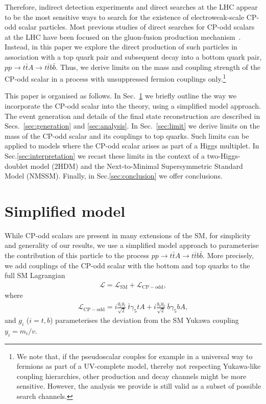 \documentclass[preprintnumbers,superscriptaddress,nofootinbib,aps,prd,floatfix]{revtex4}
\begin{document}
Therefore, indirect detection experiments and direct searches at the LHC appear to be the most sensitive ways to search for the existence of electroweak-scale CP-odd scalar particles. Most previous studies of direct searches for CP-odd scalars at the LHC have been focused on the gluon-fusion production mechanism~\cite{Klamke:2007cu,Dolan:2014upa}. Instead, in this paper we explore the direct production of such particles in association with a top quark pair and subsequent decay into a bottom quark pair, $p p \to t \bar{t} A \to t \bar{t} b \bar{b}$. Thus, we derive limits on the mass and coupling strength of the CP-odd scalar in a process with unsuppressed fermion couplings only.\footnote{We note that, if the pseudoscalar couples for example in a universal way to fermions as part of a UV-complete model, thereby not respecting Yukawa-like coupling hierarchies, other production and decay channels might be more sensitive. However, the analysis we provide is still valid as a subset of possible search channels.}

This paper is organised as follows. In Sec.~\ref{sec:model} we briefly outline the way we incorporate the CP-odd scalar into the theory, using a simplified model approach. The event generation and details of the final state reconstruction are described in Secs.~\ref{sec:generation} and \ref{sec:analysis}. In Sec.~\ref{sec:limit} we derive limits on the mass of the CP-odd scalar and its couplings to top quarks. Such limits can be applied to models where the CP-odd scalar arises as part of a Higgs multiplet. In Sec.\ref{sec:interpretation} we recast these limits in the context of a two-Higgs-doublet model (2HDM) and the 
Next-to-Minimal Supersymmetric Standard Model (NMSSM). Finally, in Sec.\ref{sec:conclusion} we offer conclusions.

\section{Simplified model}
\label{sec:model}
While CP-odd scalars are present in many extensions of the SM, for simplicity and generality of our results, we use a simplified model approach \cite{Alves:2011wf} to parameterise the contribution of this particle to the process $p p \to t \bar{t} A \to t \bar{t} b \bar{b}$. More precisely, we add couplings of the CP-odd scalar with the bottom and top quarks to the full SM Lagrangian 
\begin{eqnarray}
\mathcal{L} = \mathcal{L}_{\mathrm{SM}} + \mathcal{L}_{\mathrm{CP-odd}},
\label{eq:lagrangian}
\end{eqnarray}
where 
\begin{eqnarray}
\mathcal{L}_{\mathrm{CP-odd}} = i \frac{g_{t} y_t}{\sqrt{2}}~\bar{t} \gamma_5 t A + i \frac{g_{b} y_b}{\sqrt{2}}~\bar{b} \gamma_5 b A,
\end{eqnarray}
and $g_i$ ($i=t,b$) parameterises the deviation from the SM Yukawa coupling  $y_i = m_i/v$.
\end{document}
